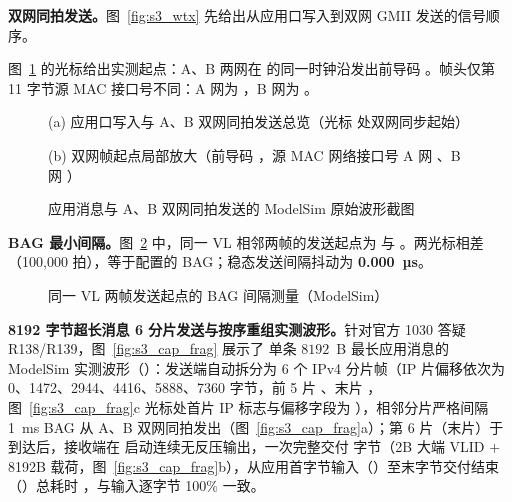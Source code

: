 \textbf{双网同拍发送。}图~\ref{fig:s3_wtx} 先给出从应用口写入到双网 GMII 发送的信号顺序。


图~\ref{fig:s3_cap_tx} 的光标给出实测起点：A、B 两网在  的同一时钟沿发出前导码 。帧头仅第 11 字节源 MAC 接口号不同：A 网为 ，B 网为 。

\begin{figure}[H]\centering
{}\par\vspace{2pt}
{\footnotesize (a) 应用口写入与 A、B 双网同拍发送总览（光标  处双网同步起始）\par}\vspace{4pt}
\par\vspace{2pt}
{\footnotesize (b) 双网帧起点局部放大（前导码 ，源 MAC 网络接口号 A 网 、B 网 ）\par}
\caption{应用消息与 A、B 双网同拍发送的 ModelSim 原始波形截图}\label{fig:s3_cap_tx}
\end{figure}

\textbf{BAG 最小间隔。}图~\ref{fig:s3_cap_bag} 中，同一 VL 相邻两帧的发送起点为  与 。两光标相差 （100,000 拍），等于配置的 BAG；稳态发送间隔抖动为 \textbf{0.000~µs}。

\begin{figure}[H]\centering
{}
\caption{同一 VL 两帧发送起点的 BAG 间隔测量（ModelSim）}\label{fig:s3_cap_bag}
\end{figure}

\textbf{8192 字节超长消息 6 分片发送与按序重组实测波形。}针对官方 1030 答疑 R138/R139，图~\ref{fig:s3_cap_frag} 展示了  单条 $8192$~B 最长应用消息的 ModelSim 实测波形（）：发送端自动拆分为 6 个 IPv4 分片帧（IP 片偏移依次为 0、1472、2944、4416、5888、7360 字节，前 5 片 、末片 ，图~\ref{fig:s3_cap_frag}c 光标处首片 IP 标志与偏移字段为 ），相邻分片严格间隔 1~ms BAG 从 A、B 双网同拍发出（图~\ref{fig:s3_cap_frag}a）；第 6 片（末片）于  到达后，接收端在  启动连续无反压输出，一次完整交付  字节（2B 大端 VLID $+$ 8192B 载荷，图~\ref{fig:s3_cap_frag}b），从应用首字节输入（）至末字节交付结束（）总耗时 ，与输入逐字节 100\% 一致。

